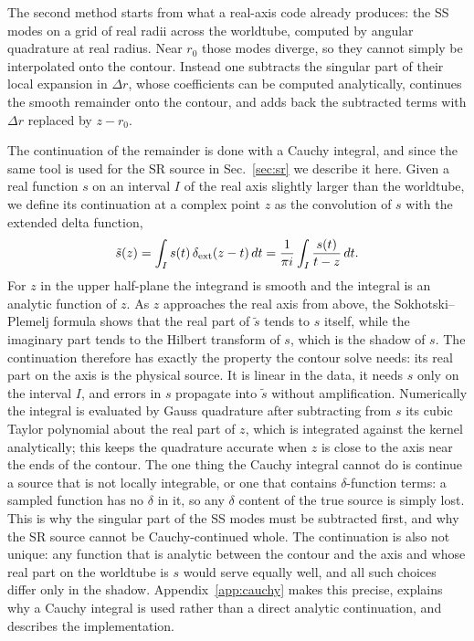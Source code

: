 \documentclass[aps,prd,twocolumn,superscriptaddress,nofootinbib,floatfix]{revtex4-2}
\newcommand{\dext}{\delta_{\rm ext}}
\begin{document}
The second method starts from what a real-axis code already produces: the SS modes on a grid of real radii across the worldtube, computed by angular quadrature at real radius.
Near $r_0$ those modes diverge, so they cannot simply be interpolated onto the contour.
Instead one subtracts the singular part of their local expansion in $\Delta r$, whose coefficients can be computed analytically, continues the smooth remainder onto the contour, and adds back the subtracted terms with $\Delta r$ replaced by $z-r_0$.

The continuation of the remainder is done with a Cauchy integral, and since the same tool is used for the SR source in Sec.~\ref{sec:sr} we describe it here.
Given a real function $s$ on an interval $I$ of the real axis slightly larger than the worldtube, we define its continuation at a complex point $z$ as the convolution of $s$ with the extended delta function,
\begin{equation}
\tilde s(z)=\int_I s(t)\,\dext(z-t)\,dt=\frac{1}{\pi i}\int_I\frac{s(t)}{t-z}\,dt.
\label{eq:cauchy}
\end{equation}
For $z$ in the upper half-plane the integrand is smooth and the integral is an analytic function of $z$.
As $z$ approaches the real axis from above, the Sokhotski--Plemelj formula shows that the real part of $\tilde s$ tends to $s$ itself, while the imaginary part tends to the Hilbert transform of $s$, which is the shadow of $s$.
The continuation therefore has exactly the property the contour solve needs: its real part on the axis is the physical source.
It is linear in the data, it needs $s$ only on the interval $I$, and errors in $s$ propagate into $\tilde s$ without amplification.
Numerically the integral is evaluated by Gauss quadrature after subtracting from $s$ its cubic Taylor polynomial about the real part of $z$, which is integrated against the kernel analytically; this keeps the quadrature accurate when $z$ is close to the axis near the ends of the contour.
The one thing the Cauchy integral cannot do is continue a source that is not locally integrable, or one that contains $\delta$-function terms: a sampled function has no $\delta$ in it, so any $\delta$ content of the true source is simply lost.
This is why the singular part of the SS modes must be subtracted first, and why the SR source cannot be Cauchy-continued whole.
The continuation is also not unique: any function that is analytic between the contour and the axis and whose real part on the worldtube is $s$ would serve equally well, and all such choices differ only in the shadow.
Appendix~\ref{app:cauchy} makes this precise, explains why a Cauchy integral is used rather than a direct analytic continuation, and describes the implementation.
\end{document}
